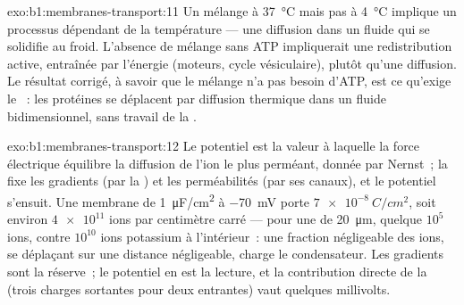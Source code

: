\begin{solution}{exo:b1:membranes-transport:11}
Un mélange à \qty{37}{\celsius} mais pas à \qty{4}{\celsius} implique un
processus dépendant de la température --- une diffusion dans un fluide
qui se solidifie au froid. L'absence de mélange sans ATP impliquerait
une redistribution active, entraînée par l'énergie (moteurs, cycle
vésiculaire), plutôt qu'une diffusion. Le résultat corrigé, à savoir que
le mélange n'a pas besoin d'ATP, est ce qu'exige le ~: les protéines se déplacent par diffusion thermique
dans un fluide bidimensionnel, sans travail de la .
\end{solution}

\begin{solution}{exo:b1:membranes-transport:12}
Le potentiel est la valeur à laquelle la force électrique équilibre la
diffusion de l'ion le plus perméant, donnée par Nernst~; la  fixe
les gradients (par la ) et les perméabilités (par ses canaux), et
le potentiel s'ensuit. Une membrane de \qty{1}{\micro F/cm^2} à
\qty{-70}{mV} porte $\qty{7e-8}{C/cm^2}$, soit environ $\num{4e11}$ ions
par centimètre carré --- pour une  de \qty{20}{\micro m}, quelque
$10^5$ ions, contre $10^{10}$ ions potassium à l'intérieur~: une
fraction négligeable des ions, se déplaçant sur une distance
négligeable, charge le condensateur. Les gradients sont la réserve~; le
potentiel en est la lecture, et la contribution directe de la 
(trois charges sortantes pour deux entrantes) vaut quelques millivolts.
\end{solution}

